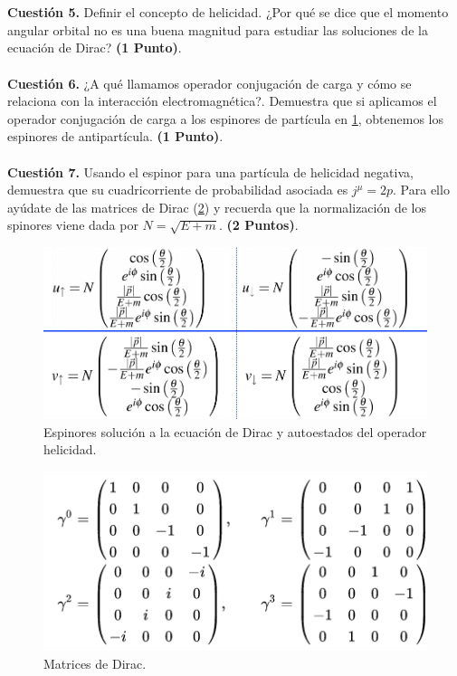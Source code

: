 \documentclass[paper=a4, fontsize=11pt]{scrartcl} %
\numberwithin{equation}{section} %
\numberwithin{figure}{section} %
\numberwithin{table}{section} %
\begin{document}
\\
\\
\textbf{Cuestión 5.} Definir el concepto de helicidad. ¿Por qué se dice que el momento angular orbital no es una buena magnitud para estudiar las soluciones de la ecuación de Dirac? \textbf{(1 Punto)}.
\\
\\
\textbf{Cuestión 6.} ¿A qué llamamos operador conjugación de carga y cómo se relaciona con la interacción electromagnética?. Demuestra que si aplicamos el operador conjugación de carga
a los espinores de partícula en \ref{espinores}, obtenemos los espinores de antipartícula. \textbf{(1 Punto)}.
\\
\\
\textbf{Cuestión 7.} Usando el espinor para una partícula de helicidad negativa, demuestra que su cuadricorriente de probabilidad asociada es $j^{\mu}=2p$. Para ello ayúdate de las matrices de Dirac (\ref{matrices}) y recuerda que la normalización de los spinores viene dada por $N=\sqrt{E+m}$. \textbf{(2 Puntos)}.



  

\begin{figure}[!h]
\begin{center}
\includegraphics[width=0.6\linewidth]{espinores.png}
\end{center}
\caption{Espinores solución a la ecuación de Dirac y autoestados del operador helicidad.}
\label{espinores}
\end{figure}


\begin{figure}[!h]
\begin{center}
\includegraphics[width=0.6\linewidth]{matrices.png}
\end{center}
\caption{Matrices de Dirac.}
\label{matrices}
\end{figure}
\end{document}
